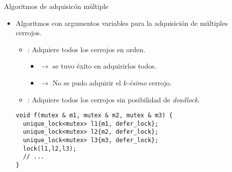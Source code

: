 \begin{frame}[fragile]{Algoritmos de adquisicón múltiple}
\begin{itemize}
  \item Algoritmos con argumentos variables para la adquisición de múltiples cerrojos.
    \begin{itemize}
      \item {}: Adquiere todos los cerrojos en orden. 
        \begin{itemize}
          \item {} $\rightarrow$ se tuvo éxito en adquirirlos todos.
          \item {} $\rightarrow$  No se pudo adquirir el \emph{k-ésimo} cerrojo.
        \end{itemize}
      \item {}: Adquiere todos los cerrojos sin posibilidad de \emph{deadlock}.
    \end{itemize}
\begin{lstlisting}
void f(mutex & m1, mutex & m2, mutex & m3) {
  unique_lock<mutex> l1{m1, defer_lock};
  unique_lock<mutex> l2{m2, defer_lock};
  unique_lock<mutex> l3{m3, defer_lock};
  lock(l1,l2,l3);
  // ...
}
\end{lstlisting}
\end{itemize}
\end{frame}

